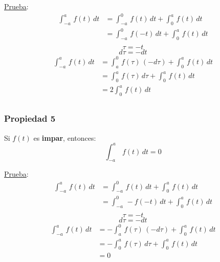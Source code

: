 \underline{Prueba}:
\begin{equation*}
\begin{split}
    \int_{-a}^a\,f(t)\,dt
        &=\int_{-a}^0\,f(t)\,dt+\int_0^a\,f(t)\,dt\\
        &=\int_{-a}^0\,f(-t)\,dt+\int_0^a\,f(t)\,dt\\
\end{split}
\end{equation*}
\begin{equation*}
    \tau=-t
\end{equation*}
\begin{equation*}
    d\tau=-dt
\end{equation*}
\begin{equation*}
\begin{split}
    \int_{-a}^a\,f(t)\,dt
        &=\int_a^0\,f(\tau)\,(-d\tau)+\int_0^a\,f(t)\,dt\\
        &=\int_0^a\,f(\tau)\,d\tau+\int_0^a\,f(t)\,dt\\
        &=2\int_0^a\,f(t)\,dt\\
\end{split}
\end{equation*}

\subsubsection*{Propiedad 5}
Si $f(t)$ es \textbf{impar}, entonces:
\begin{equation}
    \int_{-a}^a\,f(t)\,dt=0
\end{equation}
\begin{figure}[H]
    \centering
    
\end{figure}

\underline{Prueba}:
\begin{equation*}
\begin{split}
    \int_{-a}^a\,f(t)\,dt
        &=\int_{-a}^0\,f(t)\,dt+\int_0^a\,f(t)\,dt\\
        &=\int_{-a}^0\,-f(-t)\,dt+\int_0^a\,f(t)\,dt\\
\end{split}
\end{equation*}
\begin{equation*}
    \tau=-t
\end{equation*}
\begin{equation*}
    d\tau=-dt
\end{equation*}
\begin{equation*}
\begin{split}
    \int_{-a}^a\,f(t)\,dt
        &=-\int_a^0\,f(\tau)\,(-d\tau)+\int_0^a\,f(t)\,dt\\
        &=-\int_0^a\,f(\tau)\,d\tau+\int_0^a\,f(t)\,dt\\
        &=0\\
\end{split}
\end{equation*}

